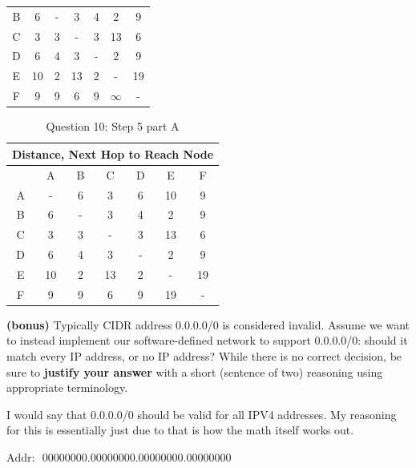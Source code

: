 \documentclass[12pt,addpoints,answers]{exam}
\begin{document}
\begin{questions}
\begin{solution}[5in]
\begin{table}[H]
\begin{tabular}{|c|c|c|c|c|c|c|}
		B    & 6   & -   & 3          & 4   	& 2          & 9   \\
		C    & 3   & 3   & -          & 3   	& 13   & 6   \\
		D    & 6   & 4   & 3          & -   	& 2          & 9   \\
		E    & 10   & 2   & 13   	& 2   & -          & 19   \\
		F    & 9   & 9   & 6          & 9   	& $\infty$          & -  \\ \hline
	\end{tabular}
\end{table}
\begin{table}[H]
	\centering
	\caption{Question 10: Step 5  part A}
	\label{Solution 10}
	\begin{tabular}{|c|c|c|c|c|c|c|}
		\hline
		\multicolumn{7}{|c|}{Distance, Next Hop to Reach Node} \\ \hline
		& A   & B   & C          & D     	& E   & F   				\\ \hline
		A    & -   & 6   & 3          & 6   & 10          & 9   \\
		B    & 6   & -   & 3          & 4   	& 2          & 9   \\
		C    & 3   & 3   & -          & 3   	& 13   & 6   \\
		D    & 6   & 4   & 3          & -   	& 2          & 9   \\
		E    & 10   & 2   & 13   	& 2   & -          & 19   \\
		F    & 9   & 9   & 6          & 9   	& 19          & -  \\ \hline
	\end{tabular}
\end{table}

\newpage

\vfill

\bonusquestion \textbf{(bonus)} Typically CIDR address 0.0.0.0/0 is considered invalid. Assume we want to instead implement our software-defined network to support 0.0.0.0/0: should it match every IP address, or no IP address? While there is no correct decision, be sure to \textbf{justify your answer} with a short (sentence of two) reasoning using appropriate terminology.
\end{solution}


\begin{solution}[1in]
	I would say that 0.0.0.0/0 should be valid for all IPV4 addresses.  My reasoning for this is essentially just due to that is how the math itself works out. 
	\begin{center}
		$\textrm{Addr: }$ 00000000.00000000.00000000.00000000
		

\end{center}
\end{solution}
\end{questions}
\end{document}
